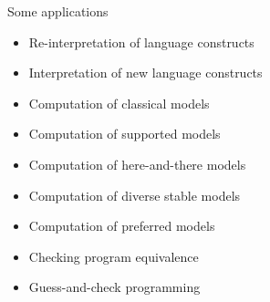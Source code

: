 \begin{frame}{Some applications}
  \begin{itemize}
  \item Re-interpretation of language constructs
  \item Interpretation of new language constructs
    \medskip
  \item Computation of classical models
  \item Computation of supported models
  \item Computation of here-and-there models
  \item Computation of diverse stable models
  \item Computation of preferred models
    \medskip
  \item Checking program equivalence
    \medskip
  \item Guess-and-check programming
  \end{itemize}
\end{frame}
%
